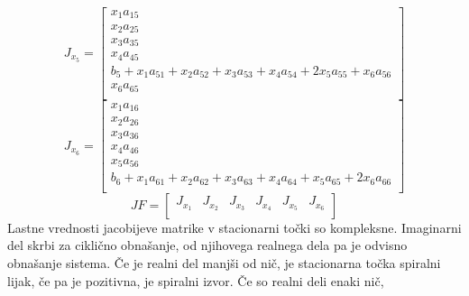 \documentclass[a4paper, 12pt]{article}
\begin{document}
\begin{equation}
	J_{x_{5}} =
	\begin{bmatrix}
		x_{1}a_{15} \\
		x_{2}a_{25} \\
		x_{3}a_{35} \\
		x_{4}a_{45} \\
		b_{5}+x_{1}a_{51}+x_{2}a_{52}+x_{3}a_{53}+x_{4}a_{54}+2x_{5}a_{55}+x_{6}a_{56} \\
		x_{6}a_{65} \\
	\end{bmatrix}
\end{equation}
\begin{equation}
	J_{x_{6}} =
	\begin{bmatrix}
		x_{1}a_{16} \\
		x_{2}a_{26} \\
		x_{3}a_{36} \\
		x_{4}a_{46} \\
		x_{5}a_{56} \\
		b_{6}+x_{1}a_{61}+x_{2}a_{62}+x_{3}a_{63}+x_{4}a_{64}+x_{5}a_{65}+2x_{6}a_{66} \\
	\end{bmatrix}
\end{equation}
\begin{equation}
	JF =
	\begin{bmatrix}
		J_{x_{1}} & J_{x_{2}} & J_{x_{3}} & J_{x_{4}} & J_{x_{5}} & J_{x_{6}} \\
	\end{bmatrix}
\end{equation}
Lastne vrednosti jacobijeve matrike v stacionarni točki so kompleksne. Imaginarni del skrbi za ciklično obnašanje, od njihovega realnega dela pa
je odvisno obnašanje sistema. Če je realni del manjši od nič, je stacionarna točka
spiralni lijak, če pa je pozitivna, je spiralni izvor. Če so realni deli enaki nič,
\end{document}
